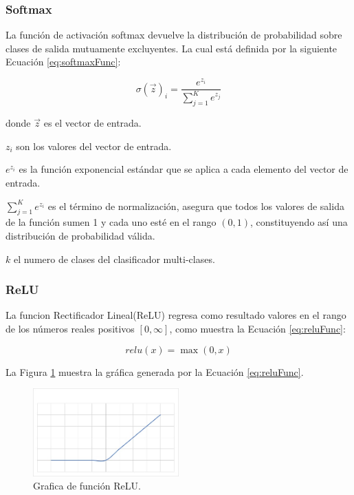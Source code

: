 \subsubsection{Softmax}

La función de activación softmax devuelve la distribución de probabilidad sobre clases de salida mutuamente excluyentes. La cual está definida por la siguiente Ecuación \ref{eq:softmaxFunc}:

\begin{equation}
\label{eq:softmaxFunc}
  \sigma(\overrightarrow{z})_{i}=\frac{e^{z_{i}}}{
    \displaystyle\sum\limits_{j=1}^K e^{z_{j}}
  }
\end{equation}

donde $\overrightarrow{z}$ es el vector de entrada.

$z_i$ son los valores del vector de entrada.

$e^{z_{i}}$ es la función exponencial estándar que se aplica a cada elemento del vector de entrada.

$\displaystyle\sum\limits_{j=1}^K e^{z_{i}}$ es el término de normalización, asegura que todos los valores de salida de la función sumen 1 y cada uno esté en el rango $(0, 1)$, constituyendo así una distribución de probabilidad válida.

$k$ el numero de clases del clasificador multi-clases.

\subsubsection{ReLU}

La funcion Rectificador Lineal(ReLU) regresa como resultado valores en el rango de los números reales positivos $[0, \infty]$, como muestra la Ecuación \ref{eq:reluFunc}:

\begin{equation}
\label{eq:reluFunc}
  relu(x)=\max(0,x)
\end{equation}

La Figura \ref{fig:graficaReLU} muestra la gráfica generada por la Ecuación \ref{eq:reluFunc}.

\begin{figure}[H]
    \centering
    \includegraphics[width=0.5\textwidth]{MarcoTeorico/imgs/GraficaReLU.jpg}
    \caption{Grafica de función ReLU.}
    \label{fig:graficaReLU}
\end{figure}


